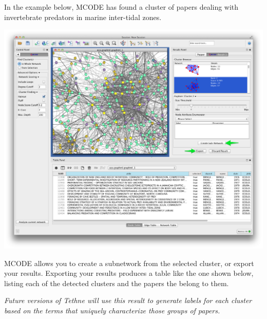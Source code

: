 \documentclass[letterpaper,10pt,english]{sphinxmanual}
\begin{document}
In the example below, MCODE has found a cluster of papers dealing with invertebrate
predators in marine inter-tidal zones.

{\hfill\includegraphics{cyto.8.png}\hfill}

MCODE allows you to create a subnetwork from the selected cluster, or export your results.
Exporting your results produces a table like the one shown below, listing each of the
detected clusters and the papers the belong to them.

\emph{Future versions of Tethne will use this result to generate labels for each cluster based
on the terms that uniquely characterize those groups of papers.}
\end{document}
